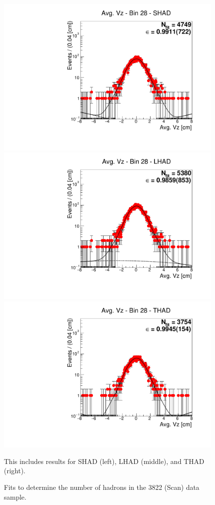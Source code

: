 \begin{figure}[H]
\centering
\includegraphics[scale=0.25]{figures/plots/nonDDbar_fit_results/scan/fit_scan_28_data_SHAD.pdf}
\hspace{-0.5cm}
\includegraphics[scale=0.25]{figures/plots/nonDDbar_fit_results/scan/fit_scan_28_data_LHAD.pdf}
\hspace{-0.5cm}
\includegraphics[scale=0.25]{figures/plots/nonDDbar_fit_results/scan/fit_scan_28_data_THAD.pdf}
\caption{Fits to determine the number of hadrons in the 3822 (Scan) data sample.}
{This includes results for SHAD (left), LHAD (middle), and THAD (right).}
\label{fig:hadron_fits_scan_28}
\end{figure}

